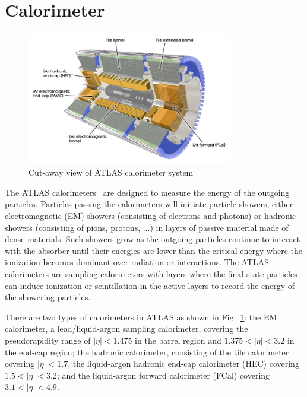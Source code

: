 \section{Calorimeter}
\label{sec:calo}
\begin{figure}[htbp]
    \centering
    \includegraphics[width=0.8\textwidth]{chapters/c4/figures/Calo}
    \caption{Cut-away view of ATLAS calorimeter system}
    \label{fig:Calo}
\end{figure}

\par The ATLAS calorimeters~\cite{CERN-LHCC-96-041} are designed to measure the energy of the outgoing particles. Particles passing the calorimeters will initiate particle showers, either electromagnetic (EM) showers (consisting of electrons and photons) or hadronic showers (consisting of pions, protons, ...) in layers of passive material made of dense materials. Such showers grow as the outgoing particles continue to interact with the absorber until their energies are lower than the critical energy where the ionization becomes dominant over radiation or interactions. The ATLAS calorimeters are sampling calorimeters with layers where the final state particles can induce ionization or scintillation in the active layers to record the energy of the showering particles.

\par There are two types of calorimeters in ATLAS as shown in Fig.~\ref{fig:Calo}: the EM calorimeter, a lead/liquid-argon sampling calorimeter, covering the pseudorapidity range of $|\eta| < 1.475$ in the barrel region and $1.375 < |\eta| < 3.2$ in the end-cap region; the hadronic calorimeter, consisting of the tile calorimeter covering $|\eta| < 1.7$, the liquid-argon hadronic end-cap calorimeter (HEC) covering $1.5 < |\eta| < 3.2$; and the liquid-argon forward calorimeter (FCal) covering $3.1 < |\eta| < 4.9$.

